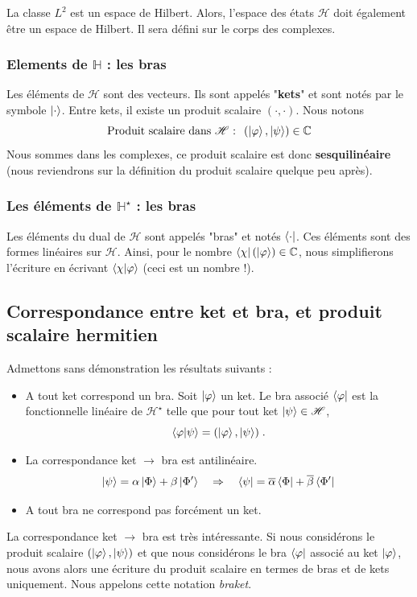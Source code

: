\documentclass[../notesdecours.tex]{subfiles}
\begin{document}
La classe $L^2$ est un espace de Hilbert. Alors, l'espace des états $\mathcal{H}$ doit également être un espace de Hilbert. Il sera défini sur le corps des complexes. 
\subsubsection{Elements de $\mathbb{H}$ : les bras}
Les éléments de $\mathcal{H}$ sont des vecteurs. Ils sont appelés "\textbf{kets}" et sont notés par le symbole $\ket \cdot$. Entre kets, il existe un produit scalaire $(\cdot, \cdot)$. Nous notons $$\text{Produit scalaire dans $\mathcal{H}$ : }\;  (\ket \varphi , \ket \psi ) \in \mathbb{C}$$
Nous sommes dans les complexes, ce produit scalaire est donc \textbf{sesquilinéaire} (nous reviendrons sur la définition du produit scalaire quelque peu après).

\subsubsection{Les éléments de $\mathbb{H}^\star$ : les bras}
Les éléments du dual de $\mathcal{H}$ sont appelés "bras" et notés $\bra \cdot$. Ces éléments sont des formes linéaires sur $\mathcal{H}$. Ainsi, pour le nombre $\bra \chi (\ket \varphi) \in \mathbb{C}$, nous simplifierons l'écriture en écrivant $\braket{\chi | \varphi}$ (ceci est un nombre !).

\subsection{Correspondance entre ket et bra, et produit scalaire hermitien}
Admettons sans démonstration les résultats suivants :
\begin{itemize}
	\item A tout ket correspond un bra. Soit $\ket \varphi$ un ket. Le bra associé $\bra \varphi$ est la fonctionnelle linéaire de $\mathcal{H}^\star$ telle que pour tout ket $\ket \psi \in \mathcal{H}$, $$\braket{\varphi | \psi}= (\ket \varphi, \ket \psi) \; .$$
	
	\item La correspondance ket $\rightarrow$ bra est antilinéaire. $$\ket{\psi} = \alpha \ket{\Phi} + \beta\ket{\Phi'} \quad \Rightarrow \quad \bra{\psi} = \overline{\alpha}\bra{\Phi}+\overline{\beta}\bra{\Phi'}$$  
	\item A tout bra ne correspond pas forcément un ket.
\end{itemize}

La correspondance ket $\rightarrow$ bra est très intéressante. Si nous considérons le produit scalaire $(\ket \varphi, \ket \psi)$ et que nous considérons le bra $\bra \varphi$ associé au ket $\ket \varphi$, nous avons alors une écriture du produit scalaire en termes de bras et de kets uniquement. Nous appelons cette notation \textit{braket}.
\end{document}
